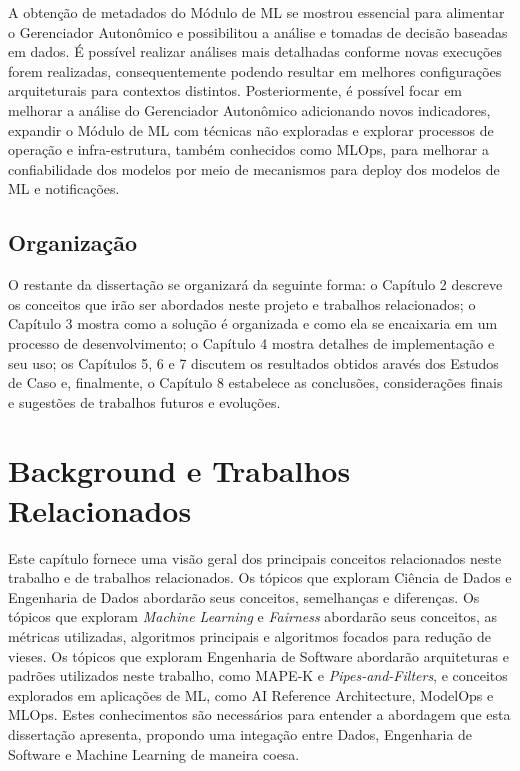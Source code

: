 \documentclass[portugues]{ic-tese}
\begin{document}
A obtenção de metadados do Módulo de ML se mostrou essencial para alimentar o Gerenciador Autonômico e possibilitou a análise e tomadas de decisão baseadas em dados. É possível realizar análises mais detalhadas conforme novas execuções forem realizadas, consequentemente podendo resultar em melhores configurações arquiteturais para contextos distintos. Posteriormente, é possível focar em melhorar a análise do Gerenciador Autonômico adicionando novos indicadores, expandir o Módulo de ML com técnicas não exploradas e explorar processos de operação e infra-estrutura, também conhecidos como MLOps, para melhorar a confiabilidade dos modelos por meio de mecanismos para deploy dos modelos de ML e notificações.

\section{Organização}

O restante da dissertação se organizará da seguinte forma: o Capítulo 2 descreve os conceitos que irão ser abordados neste projeto e trabalhos relacionados; o Capítulo 3 mostra como a solução é organizada e como ela se encaixaria em um processo de desenvolvimento; o Capítulo 4 mostra detalhes de implementação e seu uso; os Capítulos 5, 6 e 7 discutem os resultados obtidos aravés dos Estudos de Caso e, finalmente, o Capítulo 8 estabelece as conclusões, considerações finais e sugestões de trabalhos futuros e evoluções.

\chapter{Background e Trabalhos Relacionados}

Este capítulo fornece uma visão geral dos principais conceitos relacionados neste trabalho e de trabalhos relacionados. Os tópicos que exploram Ciência de Dados e Engenharia de Dados abordarão seus conceitos, semelhanças e diferenças. Os tópicos que exploram \textit{Machine Learning} e \textit{Fairness} abordarão seus conceitos, as métricas utilizadas, algoritmos principais e algoritmos focados para redução de vieses. Os tópicos que exploram Engenharia de Software abordarão arquiteturas e padrões utilizados neste trabalho, como MAPE-K e \textit{Pipes-and-Filters}, e conceitos explorados em aplicações de ML, como AI Reference Architecture, ModelOps e MLOps. Estes conhecimentos são necessários para entender a abordagem que esta dissertação apresenta, propondo uma integação entre Dados, Engenharia de Software e Machine Learning de maneira coesa.
\end{document}
